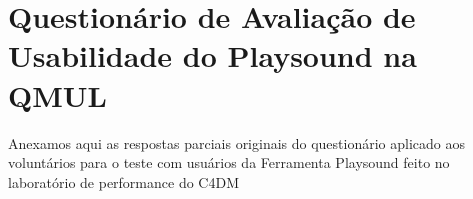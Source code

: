 \chapter{Questionário de Avaliação de Usabilidade do Playsound na QMUL}
\label{ch:questionarios}

Anexamos aqui as respostas parciais originais do questionário aplicado aos voluntários para o teste com usuários da Ferramenta Playsound feito no laboratório de performance do C4DM

